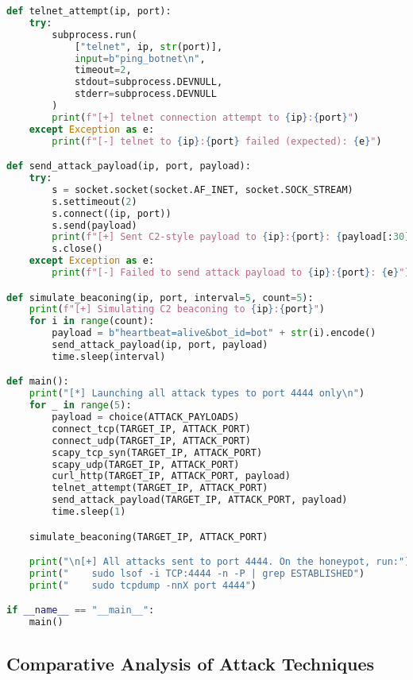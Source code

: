 \documentclass{article}
\begin{document}
\begin{lstlisting}[language=python, caption={Attack Execution Code (\texttt{attack.py})}, label={lst:attack}]
def telnet_attempt(ip, port):
    try:
        subprocess.run(
            ["telnet", ip, str(port)],
            input=b"ping_botnet\n",
            timeout=2,
            stdout=subprocess.DEVNULL,
            stderr=subprocess.DEVNULL
        )
        print(f"[+] telnet connection attempt to {ip}:{port}")
    except Exception as e:
        print(f"[-] telnet to {ip}:{port} failed (expected): {e}")

def send_attack_payload(ip, port, payload):
    try:
        s = socket.socket(socket.AF_INET, socket.SOCK_STREAM)
        s.settimeout(2)
        s.connect((ip, port))
        s.send(payload)
        print(f"[+] Sent C2-style payload to {ip}:{port}: {payload[:30]}...")
        s.close()
    except Exception as e:
        print(f"[-] Failed to send attack payload to {ip}:{port}: {e}")

def simulate_beaconing(ip, port, interval=5, count=5):
    print(f"[+] Simulating C2 beaconing to {ip}:{port}")
    for i in range(count):
        payload = b"heartbeat=alive&bot_id=bot" + str(i).encode()
        send_attack_payload(ip, port, payload)
        time.sleep(interval)

def main():
    print("[*] Launching all attack types to port 4444 only\n")
    for _ in range(5):
        payload = choice(ATTACK_PAYLOADS)
        connect_tcp(TARGET_IP, ATTACK_PORT)
        connect_udp(TARGET_IP, ATTACK_PORT)
        scapy_tcp_syn(TARGET_IP, ATTACK_PORT)
        scapy_udp(TARGET_IP, ATTACK_PORT)
        curl_http(TARGET_IP, ATTACK_PORT, payload)
        telnet_attempt(TARGET_IP, ATTACK_PORT)
        send_attack_payload(TARGET_IP, ATTACK_PORT, payload)
        time.sleep(1)

    simulate_beaconing(TARGET_IP, ATTACK_PORT)

    print("\n[+] All attacks sent to port 4444. On the honeypot, run:")
    print("    sudo lsof -i TCP:4444 -n -P | grep ESTABLISHED")
    print("    sudo tcpdump -nnX port 4444")

if __name__ == "__main__":
    main()

\end{lstlisting}
\clearpage

\subsection*{Comparative Analysis of Attack Techniques}
\end{document}
